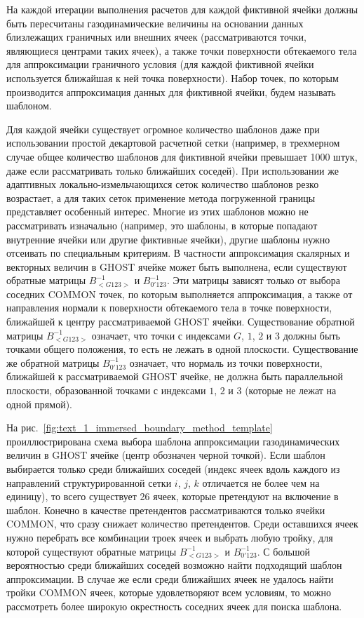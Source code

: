 
На каждой итерации выполнения расчетов для каждой фиктивной ячейки должны быть пересчитаны газодинамические величины на основании данных близлежащих граничных или внешних ячеек (рассматриваются точки, являющиеся центрами таких ячеек), а также точки поверхности обтекаемого тела для аппроксимации граничного условия (для каждой фиктивной ячейки используется ближайшая к ней точка поверхности).
Набор точек, по которым производится аппроксимация данных для фиктивной ячейки, будем называть шаблоном.

Для каждой ячейки существует огромное количество шаблонов даже при использовании простой декартовой расчетной сетки (например, в трехмерном случае общее количество шаблонов для фиктивной ячейки превышает 1000 штук, даже если рассматривать только ближайших соседей).
При использовании же адаптивных локально-измельчающихся сеток \cite{Plas2015Refinement} количество шаблонов резко возрастает, а для таких сеток применение метода погруженной границы представляет особенный интерес.
Многие из этих шаблонов можно не рассматривать изначально (например, это шаблоны, в которые попадают внутренние ячейки или другие фиктивные ячейки), другие шаблоны нужно отсеивать по специальным критериям.
В частности аппроксимация скалярных и векторных величин в GHOST ячейке может быть выполнена, если существуют обратные матрицы $B_{<G123>}^{-1}$ и $B_{0'123}^{-1}$.
Эти матрицы зависят только от выбора соседних COMMON точек, по которым выполняется аппроксимация, а также от направления нормали к поверхности обтекаемого тела в точке поверхности, ближайшей к центру рассматриваемой GHOST ячейки.
Существование обратной матрицы $B_{<G123>}^{-1}$ означает, что точки с индексами $G$, $1$, $2$ и $3$ должны быть точками общего положения, то есть не лежать в одной плоскости.
Существование же обратной матрицы $B_{0'123}^{-1}$ означает, что нормаль из точки поверхности, ближайшей к рассматриваемой GHOST ячейке, не должна быть параллельной плоскости, образованной точками с индексами $1$, $2$ и $3$ (которые не лежат на одной прямой).

На рис.~\ref{fig:text_1_immersed_boundary_method_template} проиллюстрирована схема выбора шаблона аппроксимации газодинамических величин в GHOST ячейке (центр обозначен черной точкой).
Если шаблон выбирается только среди ближайших соседей (индекс ячеек вдоль каждого из направлений структурированной сетки $i$, $j$, $k$ отличается не более чем на единицу), то всего существует 26 ячеек, которые претендуют на включение в шаблон.
Конечно в качестве претендентов рассматриваются только ячейки COMMON, что сразу снижает количество претендентов.
Среди оставшихся ячеек нужно перебрать все комбинации троек ячеек и выбрать любую тройку, для которой существуют обратные матрицы $B_{<G123>}^{-1}$ и $B_{0'123}^{-1}$.
С большой вероятностью среди ближайших соседей возможно найти подходящий шаблон аппроксимации.
В случае же если среди ближайших ячеек не удалось найти тройки COMMON ячеек, которые удовлетворяют всем условиям, то можно рассмотреть более широкую окрестность соседних ячеек для поиска шаблона.


